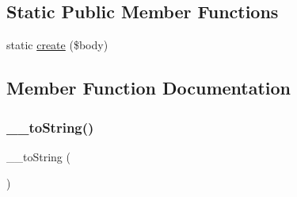 \subsection*{Static Public Member Functions}
\begin{DoxyCompactItemize}
\item 
static \mbox{\hyperlink{interfacephp_documentor_1_1_reflection_1_1_doc_block_1_1_tag_a322bfa4cad4fbe7364f4ab65c8f8588c}{create}} (\$body)
\end{DoxyCompactItemize}


\subsection{Member Function Documentation}
\mbox{\label{interfacephp_documentor_1_1_reflection_1_1_doc_block_1_1_tag_a7516ca30af0db3cdbf9a7739b48ce91d}} 
\subsubsection{\texorpdfstring{\+\_\+\+\_\+to\+String()}{\_\_toString()}}
{\footnotesize\ttfamily \+\_\+\+\_\+to\+String (\begin{DoxyParamCaption}{ }\end{DoxyParamCaption})}



